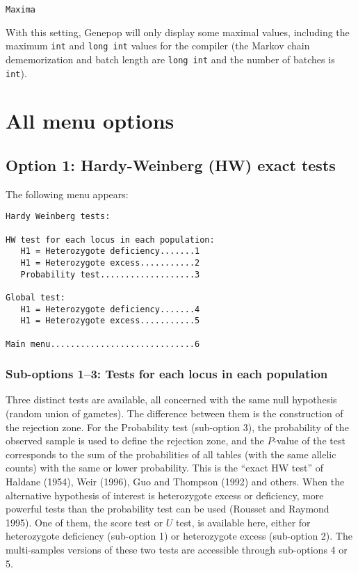 \documentclass[12pt,]{book}
\begin{document}
\texttt{Maxima}

With this setting, Genepop will only display some maximal values,
including the maximum \texttt{int} and \texttt{long\ int} values for the
compiler (the Markov chain dememorization and batch length are
\texttt{long\ int} and the number of batches is \texttt{int}).

\chapter{All menu options}\label{all-menu-options}

\section{Option 1: Hardy-Weinberg (HW) exact
tests}\label{option-1-hardy-weinberg-hw-exact-tests}

The following menu appears:

\begin{verbatim}
Hardy Weinberg tests:

HW test for each locus in each population:
   H1 = Heterozygote deficiency.......1
   H1 = Heterozygote excess...........2
   Probability test...................3

Global test:
   H1 = Heterozygote deficiency.......4
   H1 = Heterozygote excess...........5

Main menu.............................6
\end{verbatim}

\subsection{Sub-options 1--3: Tests for each locus in each
population}\label{sub-options-13-tests-for-each-locus-in-each-population}

Three distinct tests are available, all concerned with the same null
hypothesis (random union of gametes). The difference between them is the
construction of the rejection zone. For the Probability test (sub-option
3), the probability of the observed sample is used to define the
rejection zone, and the \(P\)-value of the test corresponds to the sum
of the probabilities of all tables (with the same allelic counts) with
the same or lower probability. This is the ``exact HW test'' of Haldane
(1954), Weir (1996), Guo and Thompson (1992) and others. When the
alternative hypothesis of interest is heterozygote excess or deficiency,
more powerful tests than the probability test can be used (Rousset and
Raymond 1995). One of them, the score
test or \(U\) test, is
available here, either for heterozygote deficiency (sub-option 1) or
heterozygote excess (sub-option 2). The multi-samples versions of these
two tests are accessible through sub-options 4 or 5.
\end{document}
